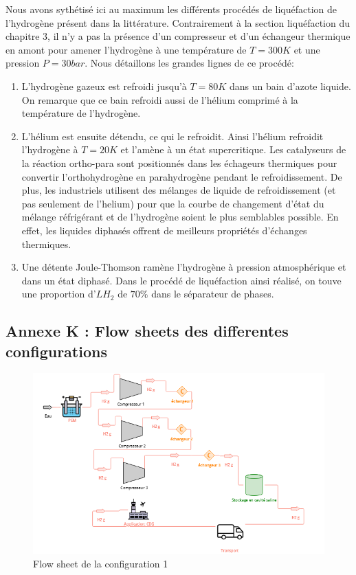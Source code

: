 \documentclass[11pt,french,a4paper]{article}
\begin{document}
Nous avons sythétisé ici au maximum les différents procédés de liquéfaction de l'hydrogène présent dans la littérature.
Contrairement à la section liquéfaction du chapitre 3, il n'y a pas la présence d'un compresseur et d'un échangeur thermique en amont pour amener l'hydrogène
à une température de $T=300K$ et une pression $P=30 bar$. Nous détaillons les grandes lignes de ce procédé:
\begin{enumerate}
  \item L'hydrogène gazeux est refroidi jusqu'à $T=80 K$ dans un bain d'azote liquide. On remarque que ce bain refroidi aussi de l'hélium comprimé à la température de l'hydrogène.
  \item L'hélium est ensuite détendu, ce qui le refroidit. Ainsi l'hélium refroidit l'hydrogène à $T=20K$ et l'amène à un état supercritique. Les catalyseurs de la réaction 
  ortho-para sont positionnés dans les échageurs thermiques pour convertir l'orthohydrogène en parahydrogène pendant le refroidissement. De plus, les industriels utilisent des mélanges de liquide de refroidissement (et pas seulement de l'helium) pour que la courbe de changement d'état 
  du mélange réfrigérant et de l'hydrogène soient le plus semblables possible. En effet, les liquides diphasés offrent de meilleurs propriétés d'échanges thermiques.
  \item Une détente Joule-Thomson ramène l'hydrogène à pression atmosphérique et dans un état diphasé. Dans le procédé de liquéfaction ainsi réalisé, on touve une proportion d'$LH_2$ de $70\%$ dans le séparateur de phases.
\end{enumerate}


\newpage
\FloatBarrier
\subsection*{Annexe K : Flow sheets des differentes configurations} 

\begin{figure}[h]
\centering
\includegraphics[width=0.8\linewidth]{image/annexe/annexe_flow/figure1annexea.png}
\caption{Flow sheet de la configuration 1 }
\end{figure}
\end{document}
